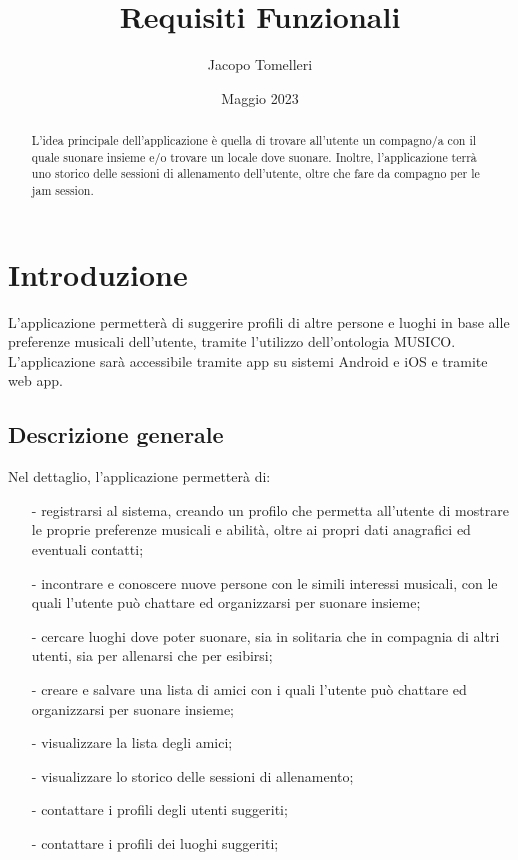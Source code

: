 \documentclass[12pt, a4paper]{article}
\title{Requisiti Funzionali}
\author{Jacopo Tomelleri}
\date{Maggio 2023}
\begin{document}
\maketitle
\newpage

\begin{abstract}
    L'idea principale dell'applicazione è quella di trovare all'utente un compagno/a con il quale suonare insieme e/o trovare un locale dove suonare.
    Inoltre, l'applicazione terrà uno storico delle sessioni di allenamento dell'utente, oltre che fare da compagno per le jam session.
\end{abstract}

\section{Introduzione}
L'applicazione permetterà di suggerire profili di altre persone e luoghi in base alle preferenze musicali dell'utente, tramite l'utilizzo dell'ontologia MUSICO.
L'applicazione sarà accessibile tramite app su sistemi Android e iOS e tramite web app.

\subsection{Descrizione generale}

Nel dettaglio, l'applicazione permetterà di:
\begin{itemize}
    \item[-] registrarsi al sistema, creando un profilo che permetta all'utente di mostrare le proprie preferenze musicali e abilità, oltre ai propri dati anagrafici ed eventuali contatti;
    \item[-] incontrare e conoscere nuove persone con le simili interessi musicali, con le quali l'utente può chattare ed organizzarsi per suonare insieme;
    \item[-] cercare luoghi dove poter suonare, sia in solitaria che in compagnia di altri utenti, sia per allenarsi che per esibirsi;
    \item[-] creare e salvare una lista di amici con i quali l'utente può chattare ed organizzarsi per suonare insieme;
    \item[-] visualizzare la lista degli amici;
    \item[-] visualizzare lo storico delle sessioni di allenamento;
    \item[-] contattare i profili degli utenti suggeriti;
    \item[-] contattare i profili dei luoghi suggeriti;
\end{itemize}
\end{document}
